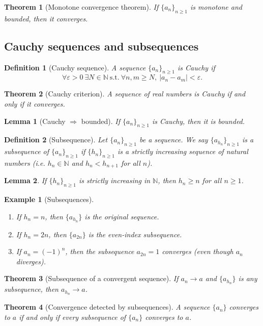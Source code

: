 \documentclass[12pt]{article}
\newtheorem*{lemma}{Lemma}
\newtheorem{theorem}{Theorem}
\newtheorem{definition}{Definition}
\newtheorem{example}{Example}
\begin{document}
\begin{theorem}[Monotone convergence theorem]
If $\{a_n\}_{n\ge1}$ is monotone and bounded, then it converges.
\end{theorem}

\subsection*{Cauchy sequences and subsequences}

\begin{definition}[Cauchy sequence]
A sequence $\{a_n\}_{n\ge1}$ is \emph{Cauchy} if
\[
\forall\varepsilon>0\ \exists N\in\mathbb{N}\ \text{s.t.}\ \forall n,m\ge N,\ |a_n-a_m|<\varepsilon.
\]
\end{definition}

\begin{theorem}[Cauchy criterion]
A sequence of real numbers is Cauchy if and only if it converges.
\end{theorem}

\begin{lemma}[Cauchy $\Rightarrow$ bounded]
If $\{a_n\}_{n\ge1}$ is Cauchy, then it is bounded.
\end{lemma}

\begin{definition}[Subsequence]
Let $\{a_n\}_{n\ge1}$ be a sequence.  We say $\{a_{h_n}\}_{n\ge1}$ is a \emph{subsequence} of $\{a_n\}_{n\ge1}$ if $\{h_n\}_{n\ge1}$ is a strictly increasing sequence of natural numbers (i.e. $h_n\in\mathbb{N}$ and $h_n<h_{n+1}$ for all $n$).
\end{definition}

\begin{lemma}
If $\{h_n\}_{n\ge1}$ is strictly increasing in $\mathbb{N}$, then $h_n\ge n$ for all $n\ge1$.
\end{lemma}

\begin{example}[Subsequences]
\begin{enumerate}
\item If $h_n=n$, then $\{a_{h_n}\}$ is the original sequence.
\item If $h_n=2n$, then $\{a_{2n}\}$ is the even-index subsequence.
\item If $a_n=(-1)^n$, then the subsequence $a_{2n}=1$ converges (even though $a_n$ diverges).
\end{enumerate}
\end{example}

\begin{theorem}[Subsequence of a convergent sequence]
If $a_n\to a$ and $\{a_{h_n}\}$ is any subsequence, then $a_{h_n}\to a$.
\end{theorem}

\begin{theorem}[Convergence detected by subsequences]
A sequence $\{a_n\}$ converges to $a$ if and only if every subsequence of $\{a_n\}$ converges to $a$.
\end{theorem}
\end{document}

